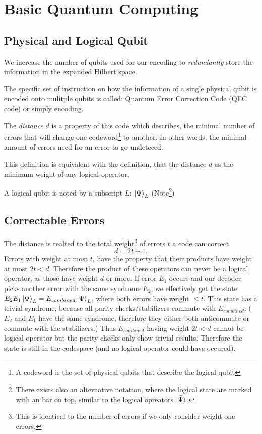 \section{Basic Quantum Computing}


\subsection{Physical and Logical Qubit}
We increase the number of qubits used for our encoding to \textit{redundantly} store the information in the expanded Hilbert space. \cite{QECintro}

The specific set of instruction on how the information of a single physical 
qubit is encoded onto mulitple qubits is called:
Quantum Error Correction Code (QEC code) or simply encoding. \cite{QECintro}

The \textit{distance} $d$ is a property of this code which describes, 
the minimal number of errors that will change one 
codeword\footnote{A codeword is the set of physical qubits that describe the logical qubit} to another.
In other words, the minimal amount of errors need for an error to go undeteced. \cite{QECintro}

This definition is equivalent with the definition, that the distance $d$ as the minimum weight of any logical operator. \cite{QECmemory}

A logical qubit is noted by a subscript $L$: $\ket{\Psi}_L$
(Note\footnote{
    There exists also an alternative notation, where the logical state are marked with an bar on top, similar to the logical opreators $\bar{\ket{\Psi}}$. 
})


\subsection{Correctable Errors}
The distance is realted to the total weight\footnote{This is identical to the number of errors if we only consider weight one errors.} of errors $t$ a code can correct \cite{QECintro}
\begin{equation}
    d = 2t+1.
\end{equation}
Errors with weight at most $t$, have the property that their products have weight at most $2t<d$.
Therefore the product of these operators can never be a logical operator, as those have weight $d$ or more. 
If error $E_1$ occurs and our decoder picks another error with the same syndrome $E_2$, 
we effectively get the state $E_2 E_1 \ket{\Psi}_L = E_{combined} \ket{\Psi}_L$, where both errors have weight $\leq t$.
This state has a trivial syndrome, because all parity checks/stabilizers commute with $E_{combined}$.
($E_2$ and $E_1$ have the same syndrome, therefore they either both anticommute or commute with the stabilizers.) 
Thus $E_{combined}$ having weight $2t<d$ cannot be logical operator but the parity checks only show trivial results. \cite{QECmemory}
Therefore the state is still in the codespace (and no logical operator could have occured).

